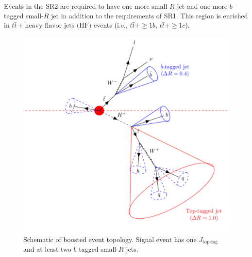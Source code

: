 Events in the SR2 are required to have one more small-$R$ jet and one more $b$-tagged small-$R$ jet in addition to the requirements of SR1. This region is enriched in $t\bar{t}+\text{heavy flavor jets (HF)}$ events (i.e., $t\bar{t}+\geq{1b}$, $t\bar{t}+\geq{1c}$). 

\begin{figure}[H]
  \centering
  \includegraphics[keepaspectratio,scale=0.8]{images/AnalysisStrategy/EventTopology.png}
  \caption{Schematic of boosted event topology. Signal event has one $J_{\text{top-tag}}$ and at least two $b$-tagged small-$R$ jets.}
  \label{fig:EventTopology_Htb}
\end{figure}

